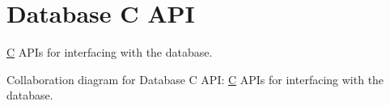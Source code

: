 \hypertarget{group__database_c}{}\section{Database C A\+PI}
\label{group__database_c}


\mbox{\hyperlink{struct_c}{C}} A\+P\+Is for interfacing with the database.  


Collaboration diagram for Database C A\+PI\+:
\mbox{\hyperlink{struct_c}{C}} A\+P\+Is for interfacing with the database. 

